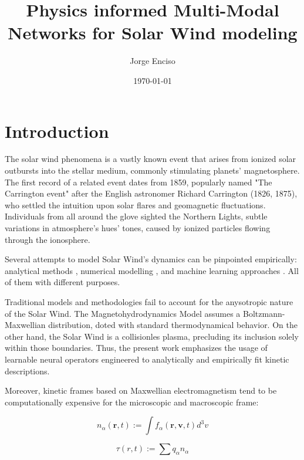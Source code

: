 \documentclass[12pt]{article}
\title{Physics informed Multi-Modal Networks for Solar Wind modeling}
\author{Jorge Enciso}
\date{\today}
\begin{document}
\maketitle

\begin{abstract}
\end{abstract}

\tableofcontents
\newpage

\section{Introduction}

The solar wind phenomena is a vastly known event that arises from ionized solar outbursts into the stellar medium, commonly stimulating planets' magnetosphere. \cite{Gosling2007} The first record of a related event dates from 1859, popularly named "The Carrington event" after the English astronomer Richard Carrington (1826, 1875), who settled the intuition upon solar flares and geomagnetic fluctuations. Individuals from all around the glove sighted the Northern Lights, subtle variations in atmosphere's hues' tones, caused by ionized particles flowing through the ionosphere.

Several attempts to model Solar Wind's dynamics can be pinpointed empirically: analytical methods \cite{}, numerical modelling \cite{2006LNCS.3732..554E, 10.3389/fspas.2023.1105797, windmodelling1}, and machine learning approaches \cite{comp_1, comp_2, comp_3}. All of them with different purposes.

Traditional models and methodologies fail to account for the anysotropic nature of the Solar Wind. The Magnetohydrodynamics Model assumes a Boltzmann-Maxwellian distribution, doted with standard thermodynamical behavior. On the other hand, the Solar Wind is a collisionles plasma, precluding its inclusion solely within those boundaries. Thus, the present work emphasizes the usage of learnable neural operators engineered to analytically and empirically fit kinetic descriptions.

Moreover, kinetic frames based on Maxwellian electromagnetism tend to be computationally expensive for the microscopic and macroscopic frame:

\begin{equation}
    n_{\alpha} (\mathbf{r}, t) := \int f_{\alpha}(\mathbf{r}, \mathbf{v}, t) d^3v
\end{equation}

\begin{equation}
    \tau(r, t) := \sum q_{\alpha} n_{\alpha}
\end{equation}
\end{document}
